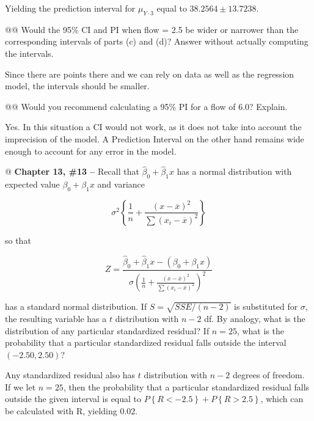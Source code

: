 \documentclass[10pt]{article}\usepackage[]{graphicx}\usepackage[]{xcolor}
\begin{document}
\begin{easylist}[enumerate]
    Yielding the prediction interval for $\mu_{Y \cdot 3}$ equal to $38.2564 \pm 13.7238$.

    @@ Would the 95\% CI and PI when flow = 2.5 be wider or narrower than the corresponding intervals of parts (c) and
    (d)? Answer without actually computing the intervals.\newline

    Since there are points there and we can rely on data as well as the regression model, the intervals should be
    smaller.

    @@ Would you recommend calculating a 95\% PI for a flow of 6.0? Explain.\newline

    Yes. In this situation a CI would not work, as it does not take into account the imprecision of the model. A
    Prediction Interval on the other hand remains wide enough to account for any error in the model.

    @ \textbf{Chapter 13, \#13 --} Recall that $\hat{\beta}_0 + \hat{\beta}_1 x$ has a normal distribution with expected
    value $\beta_0 + \beta_1 x$ and variance

    \begin{equation}
        \sigma^2 \left\{ \frac{1}{n} + \frac{ {\left( x - \overline{x} \right)}^2}
                 {\sum { \left( x_i - \overline{x} \right)}^2} \right\}
    \end{equation}

    so that

    \begin{equation}
        Z = \frac{\hat{\beta}_0 + \hat{\beta}_1 x - \left( \beta_0 + \beta_1 x \right)}
        {\sigma { \left( \frac{1}{n} + \frac{ {\left( x - \overline{x} \right)}^2}
                        {\sum { \left( x_i - \overline{x} \right)}^2} \right) }^2}
    \end{equation}

    has a standard normal distribution. If $S = \sqrt{SSE/(n-2)}$ is substituted for $\sigma$, the resulting
    variable has a $t$ distribution with $n - 2$ df. By analogy, what is the distribution of any particular standardized
    residual? If $n = 25$, what is the probability that a particular standardized residual falls outside the interval
    $(-2.50, 2.50)$?\newline

    Any standardized residual also has $t$ distribution with $n - 2$ degrees of freedom. If we let $n=25$, then the
    probability that a particular standardized residual falls outside the given interval is equal to
    $P\left\{ R < -2.5 \right\} + P\left\{ R > 2.5 \right\}$, which can be calculated with R, yielding
    $0.02$.
\end{easylist}

\newpage
\end{document}
